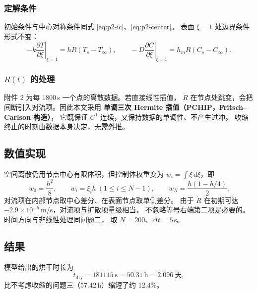 \documentclass[12pt,a4paper]{ctexart}
\begin{document}
\subsubsection{定解条件}

初始条件与中心对称条件同式 \eqref{eq:p2-ic}、\eqref{eq:p2-center}。
表面 $\xi=1$ 处边界条件形式不变：
\begin{equation}
  -k\left.\frac{\partial T}{\partial\xi}\right|_{\xi=1}
  =hR\left(T_s-T_\infty\right),\qquad
  -D\left.\frac{\partial C}{\partial\xi}\right|_{\xi=1}
  =h_mR\left(C_s-C_\infty\right).
  \label{eq:p4-bc}
\end{equation}

\subsubsection{$R(t)$ 的处理}

附件 2 为每 $1800$\,s 一个点的离散数据。若直接线性插值，
$\dot R$ 在节点处跳变，会把间断引入对流项。因此本文采用
\textbf{单调三次 Hermite 插值（PCHIP，Fritsch--Carlson 构造）}，
它既保证 $C^1$ 连续，又保持数据的单调性、不产生过冲。
收缩终止的时刻由数据本身决定，无需外推。

\subsection{数值实现}

空间离散仍用节点中心有限体积，但控制体权重变为
$w_i=\int\xi\,\mathrm{d}\xi$，即
\begin{equation}
  w_0=\frac{h^2}{8},\qquad w_i=\xi_i h\ (1\le i\le N-1),\qquad
  w_N=\frac{h(1-h/4)}{2}.
\end{equation}
对流项在内部节点取中心差分、在表面节点取单侧差分。
由于 $\dot R$ 在初期可达 $-2.9\times10^{-5}$\,m/s，对流项与扩散项量级相当，
不忽略等号右端第二项是必要的。时间方向与非线性处理同问题二，
取 $N=200$、$\Delta t=5$\,s。

\subsection{结果}

模型给出的烘干时长为
\begin{equation}
  t_{\mathrm{dry}}=181115\ \mathrm{s}=50.31\ \mathrm{h}=2.096\ \text{天},
\end{equation}
比不考虑收缩的问题三（$57.42$\,h）缩短了约 $12.4\%$。
\end{document}
